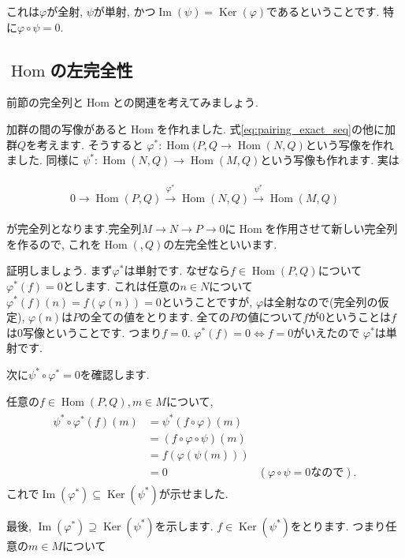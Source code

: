 \documentclass{jsarticle}
\newcommand{\makeop}[1]{\mathop{\mathrm{#1}}\nolimits}
\def\Im{\makeop{Im}}
\def\Ker{\makeop{Ker}}
\def\Hom{\makeop{Hom}}
\theoremstyle{definition}
\numberwithin{theorem}{section}
\begin{document}
これは$\varphi$が全射, $\psi$が単射, かつ$\Im(\psi) = \Ker(\varphi)$であるということです. 特に$\varphi\circ\psi = 0$.

\subsection{$\Hom$の左完全性}
前節の完全列と$\Hom$との関連を考えてみましょう.

加群の間の写像があると$\Hom$を作れました. 式\ref{eq:pairing_exact_seq}の他に加群$Q$を考えます. そうすると
$\varphi^*: \Hom(P, Q \rightarrow \Hom(N, Q)$という写像を作れました. 同様に
$\psi^*: \Hom(N, Q) \rightarrow \Hom(M, Q)$という写像も作れます. 実は

\begin{eqnarray*}
\begin{aligned}
0 \rightarrow \Hom(P, Q) \xrightarrow{\varphi^*} \Hom(N, Q) \xrightarrow{\psi^*} \Hom(M, Q)
\end{aligned}
\end{eqnarray*}

が完全列となります.完全列$M\rightarrow N \rightarrow P \rightarrow 0$に$\Hom$を作用させて新しい完全列を作るので,
これを$\Hom(, Q)$の左完全性といいます.

証明しましょう. まず$\varphi^*$は単射です. なぜなら$f \in \Hom(P, Q)$について$\varphi^*(f) = 0$とします. これは任意の$n\in N$について
$\varphi^*(f)(n) = f(\varphi(n)) = 0$ということですが, $\varphi$は全射なので(完全列の仮定), $\varphi(n)$は$P$の全ての値をとります.
全ての$P$の値について$f$が0ということは$f$は0写像ということです. つまり$f=0$. $\varphi^*(f) = 0 \Leftrightarrow f = 0$がいえたので
$\varphi^*$は単射です. 

次に$\psi^*\circ\varphi^* = 0$を確認します. 

任意の$f\in\Hom(P, Q), m \in M$について, 
\begin{eqnarray*}
\begin{aligned}
\psi^*\circ\varphi^*(f)(m) &= \psi^*(f\circ\varphi)(m)\\
&= (f\circ\varphi\circ\psi)(m)\\
&= f(\varphi(\psi(m)))\\
&= 0 & (\varphi\circ\psi = 0なので).
\end{aligned}
\end{eqnarray*}
これで$\Im(\varphi^*)\subseteq\Ker(\psi^*)$が示せました.

最後, $\Im(\varphi^*)\supseteq \Ker(\psi^*)$を示します. $f\in\Ker(\psi^*)$をとります. つまり任意の$m\in M$について
\end{document}
